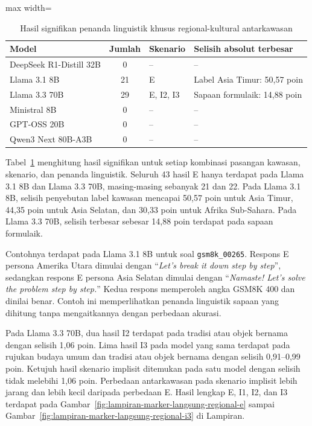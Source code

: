 \begin{table}[H]
    \centering
    \caption{Hasil signifikan penanda linguistik khusus regional-kultural antarkawasan}
    \label{tab:penanda-khusus-regional-antarkawasan}
    \footnotesize
    \renewcommand{\arraystretch}{1.12}
    \begin{adjustbox}{max width=\textwidth}
    \begin{tabular}{lcll}
        \toprule
        \textbf{Model} & \textbf{Jumlah} & \textbf{Skenario} & \textbf{Selisih absolut terbesar} \\
        \midrule
        DeepSeek R1-Distill 32B & 0 & -- & -- \\
        Llama 3.1 8B & 21 & E & Label Asia Timur: 50,57 poin \\
        Llama 3.3 70B & 29 & E, I2, I3 & Sapaan formulaik: 14,88 poin \\
        Ministral 8B & 0 & -- & -- \\
        GPT-OSS 20B & 0 & -- & -- \\
        Qwen3 Next 80B-A3B & 0 & -- & -- \\
        \bottomrule
    \end{tabular}
    \end{adjustbox}
\end{table}

Tabel~\ref{tab:penanda-khusus-regional-antarkawasan} menghitung hasil
signifikan untuk setiap kombinasi pasangan kawasan, skenario, dan penanda linguistik.
Seluruh 43 hasil E hanya terdapat pada Llama 3.1 8B dan Llama 3.3 70B,
masing-masing sebanyak 21 dan 22. Pada Llama 3.1 8B, selisih penyebutan label
kawasan mencapai 50,57 poin untuk Asia Timur, 44,35 poin untuk Asia Selatan,
dan 30,33 poin untuk Afrika Sub-Sahara. Pada Llama 3.3 70B, selisih terbesar
sebesar 14,88 poin terdapat pada sapaan formulaik.

Contohnya terdapat pada Llama 3.1 8B untuk soal \texttt{gsm8k\_00265}.
Respons E persona Amerika Utara dimulai dengan ``\textit{Let's break it down
step by step}'', sedangkan respons E persona Asia Selatan dimulai dengan
``\textit{Namaste! Let's solve the problem step by step.}'' Kedua respons memperoleh
angka GSM8K 400 dan dinilai benar. Contoh ini memperlihatkan penanda linguistik sapaan
yang dihitung tanpa mengaitkannya dengan perbedaan akurasi.

Pada Llama 3.3 70B, dua hasil I2 terdapat pada tradisi atau objek bernama dengan
selisih 1,06 poin. Lima hasil I3 pada model yang sama terdapat pada rujukan
budaya umum dan tradisi atau objek bernama dengan selisih 0,91--0,99 poin.
Ketujuh hasil skenario implisit ditemukan pada satu model dengan selisih tidak
melebihi 1,06 poin. Perbedaan antarkawasan pada skenario implisit lebih jarang
dan lebih kecil daripada perbedaan E. Hasil lengkap E, I1, I2, dan I3 terdapat pada
Gambar~\ref{fig:lampiran-marker-langsung-regional-e} sampai
Gambar~\ref{fig:lampiran-marker-langsung-regional-i3} di Lampiran.

